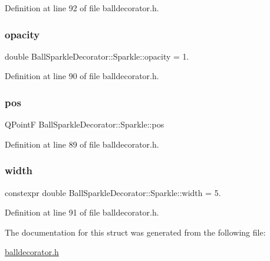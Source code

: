 Definition at line 92 of file balldecorator.\+h.

\mbox{\label{struct_ball_sparkle_decorator_1_1_sparkle_a44963032a6ce95c5b552d4c5159f88c2}} 
\subsubsection{\texorpdfstring{opacity}{opacity}}
{\footnotesize\ttfamily double Ball\+Sparkle\+Decorator\+::\+Sparkle\+::opacity = 1.}



Definition at line 90 of file balldecorator.\+h.

\mbox{\label{struct_ball_sparkle_decorator_1_1_sparkle_aeb4b735006a31fa11fa78394a4848236}} 
\subsubsection{\texorpdfstring{pos}{pos}}
{\footnotesize\ttfamily Q\+PointF Ball\+Sparkle\+Decorator\+::\+Sparkle\+::pos}



Definition at line 89 of file balldecorator.\+h.

\mbox{\label{struct_ball_sparkle_decorator_1_1_sparkle_a6602f6013f4b6d436cf07a67c9a2b98d}} 
\subsubsection{\texorpdfstring{width}{width}}
{\footnotesize\ttfamily constexpr double Ball\+Sparkle\+Decorator\+::\+Sparkle\+::width = 5.\hspace{0.3cm}{\ttfamily [static]}}



Definition at line 91 of file balldecorator.\+h.



The documentation for this struct was generated from the following file\+:\begin{DoxyCompactItemize}
\item 
\mbox{\hyperlink{balldecorator_8h}{balldecorator.\+h}}\end{DoxyCompactItemize}
